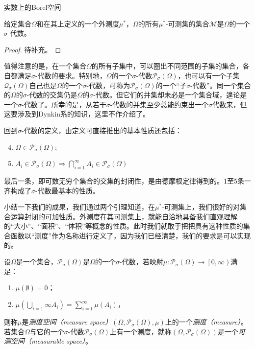 \documentclass[main.tex]{subfiles}
\begin{document}
\begin{example}
    实数上的Borel空间
\end{example}

\begin{lemma}
    给定集合$\Omega$和在其上定义的一个外测度$\mu^*$，$\Omega$的所有$\mu^*$-可测集的集合$\mathcal{M}$是$\Omega$的一个$\sigma$-代数。
\end{lemma}
\begin{proof}
    待补充。%
\end{proof}

值得注意的是，在一个集合$\Omega$的所有子集中，可以圈出不同范围的子集的集合，各自都满足$\sigma$-代数的要求。特别地，$\Omega$的一个$\sigma$-代数$\mathcal{P}_\sigma\left(\Omega\right)$，也可以有一个子集$\mathcal{Q}_\sigma\left(\Omega\right)$自己也是$\Omega$的一个$\sigma$-代数，可称为$\mathcal{P}_\sigma\left(\Omega\right)$的一个“子$\sigma$-代数”。同一个集合的$\Omega$的$\sigma$-代数的交集仍是$\Omega$的$\sigma$-代数。但它们的并集却未必是一个集合域，遑论是一个$\sigma$-代数了。所幸的是，从若干$\sigma$-代数的并集至少总能约束出一个$\sigma$代数来，但这要涉及到Dynkin系的知识，这里不作介绍了。

回到$\sigma$-代数的定义，由定义可直接推出的基本性质还包括：
\begin{enumerate}
    \setcounter{enumi}{3}
    \item $\Omega\in\mathcal{P}_\sigma\left(\Omega\right)$;
    \item $A_i\in\mathcal{P}_\sigma\left(\Omega\right)\Rightarrow\bigcap_{i=1}^\infty A_i\in\mathcal{P}_\sigma\left(\Omega\right)$
\end{enumerate}
最后一条，即可数无穷个集合的交集的封闭性，是由德摩根定律得到的。1至5条一齐构成了$\sigma$-代数最基本的性质。

小结一下我们的成果，我们通过两个引理知道，在$\mu^*$-可测集上，我们很好的对集合运算封闭的可加性质。外测度在其可测集上，就能自洽地具备我们直观理解的“大小”、“面积”、“体积”等概念的性质。此时我们就敢于把把具有这种性质的集合函数以“测度”作为名称进行定义了，因为我们已经清楚，我们的要求是可以实现的。

\begin{definition}[测度和测度空间]
    设$\Omega$是一个集合，$\mathcal{P}_\sigma\left(\Omega\right)$是$\Omega$的一个$\sigma$-代数，若映射$\mu:\mathcal{P}_\sigma\left(\Omega\right)\rightarrow\left[0,\infty\right)$满足：
    \begin{enumerate}
        \item $\mu\left(\emptyset\right)=0$；
        \item $\mu\left(\bigcup_{i=1}\infty A_i\right)=\sum_{i=1}^\infty\mu\left(A_i\right)$，
    \end{enumerate}
    则称$\mu$是\emph{测度空间（measure space）}$\left(\Omega,\mathcal{P}_\sigma\left(\Omega\right),\mu\right)$上的一个\emph{测度（measure）}。若集合$\Omega$与它的一个$\sigma$-代数$\mathcal{P}_\sigma\left(\Omega\right)$上有一个测度，就称$\left(\Omega,\mathcal{P}_\sigma\left(\Omega\right)\right)$是一个\emph{可测空间（measurable space）}。
\end{definition}
\end{document}
